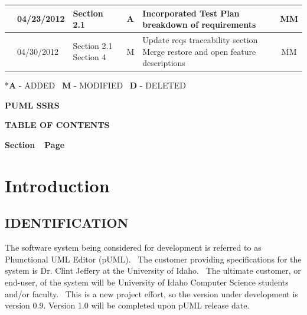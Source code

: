 \documentclass[twoside,letterpaper]{article}
\begin{document}
\begin{flushleft}
\begin{supertabular}[c]{|m{0.75in}|m{1.0in}|m{1.5in}|m{0.25in}|m{2in}|c|}
\\\hline
{}
& 04/23/2012
& Section 2.1
& \centering A
& Incorporated Test Plan breakdown of requirements
& MM

\\\hline
{}
& 04/30/2012
& Section 2.1 \newline
  Section 4 
& \centering M
& Update reqs traceability section \newline
  Merge restore and open feature descriptions
& MM


\\\hline
\end{supertabular}
\end{flushleft}










{
{*}{\textbf{A}}{
- ADDED
\ }{\textbf{M}}{ -
MODIFIED
\ }{\textbf{D}}{ -
DELETED}}

\clearpage
{\centering\bfseries {\MakeUppercase{pUML SSRS}}
\par}

{\centering\bfseries
TABLE OF CONTENTS
\par}


\bigskip

{\bfseries
Section\ \ Page}

\setcounter{tocdepth}{9}
\renewcommand\contentsname{}
\tableofcontents

\bigskip








\clearpage\clearpage\setcounter{page}{1}\pagestyle{Convertii}
\section[Introduction]{\bfseries
Introduction}

\subsection[IDENTIFICATION]{\bfseries
IDENTIFICATION}
{
The software system being considered for development is referred to as Phunctional UML Editor (pUML). \ The customer providing specifications
for the system is Dr. Clint Jeffery at the University of Idaho. \ The ultimate
customer, or end-user, of the system will be University of Idaho Computer Science students and/or faculty. \ This is a new project effort, so the version under development is version 0.9.
\newline Version 1.0 will be completed upon pUML release date.}
\end{document}
